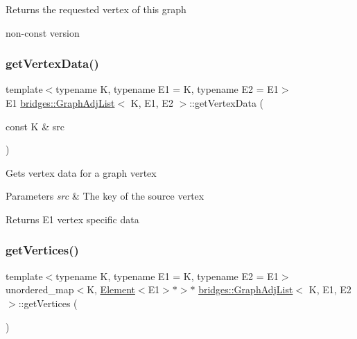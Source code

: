 \begin{DoxyReturn}{Returns}
the requested vertex of this graph
\end{DoxyReturn}
non-\/const version \mbox{\label{classbridges_1_1_graph_adj_list_a2b419a910171cafac2b71ba9f8692e5e}} 
\subsubsection{\texorpdfstring{get\+Vertex\+Data()}{getVertexData()}}
{\footnotesize\ttfamily template$<$typename K, typename E1 = K, typename E2 = E1$>$ \\
E1 \mbox{\hyperlink{classbridges_1_1_graph_adj_list}{bridges\+::\+Graph\+Adj\+List}}$<$ K, E1, E2 $>$\+::get\+Vertex\+Data (\begin{DoxyParamCaption}\item[{const K \&}]{src }\end{DoxyParamCaption})\hspace{0.3cm}{\ttfamily [inline]}}

Gets vertex data for a graph vertex


\begin{DoxyParams}{Parameters}
{\em src} & The key of the source vertex\\
\hline
\end{DoxyParams}
\begin{DoxyReturn}{Returns}
E1 vertex specific data 
\end{DoxyReturn}
\mbox{\label{classbridges_1_1_graph_adj_list_a157c80e2bd439572f4f80e8850700297}} 
\subsubsection{\texorpdfstring{get\+Vertices()}{getVertices()}}
{\footnotesize\ttfamily template$<$typename K, typename E1 = K, typename E2 = E1$>$ \\
unordered\+\_\+map$<$K, \mbox{\hyperlink{classbridges_1_1_element}{Element}}$<$E1$>$$\ast$$>$$\ast$ \mbox{\hyperlink{classbridges_1_1_graph_adj_list}{bridges\+::\+Graph\+Adj\+List}}$<$ K, E1, E2 $>$\+::get\+Vertices (\begin{DoxyParamCaption}{ }\end{DoxyParamCaption})\hspace{0.3cm}{\ttfamily [inline]}}

